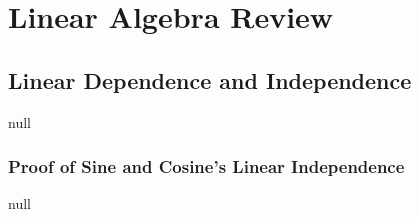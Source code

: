 \chapter{Linear Algebra Review}
\section{Linear Dependence and Independence}
null
\subsection{Proof of Sine and Cosine's Linear Independence}
null
